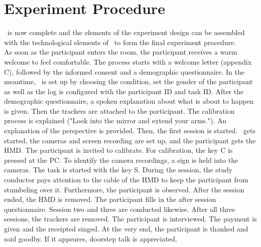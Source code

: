 \section{Experiment Procedure}
\label{sec:procedure}
\exgo\ is now complete and the elements of the experiment design can be assembled with the technological elements of \exgo\ to form the final experiment procedure.\\
As soon as the participant enters the room, the participant receives a warm welcome to feel comfortable. The process starts with a welcome letter (appendix C), followed by the informed consent and a demographic questionnaire. In the meantime, \exgo\ is set up by choosing the condition, set the gender of the participant as well as the log is configured with the participant ID and task ID. After the demographic questionnaire, a spoken explanation about what is about to happen is given. Then the trackers are attached to the participant. The calibration process is explained ("Look into the mirror and extend your arms."). An explanation of the perspective is provided. Then, the first session is started. \exgo\ gets started, the cameras and screen recording are set up, and the participant gets the HMD. The participant is invited to calibrate. For calibration, the key C is pressed at the PC. To identify the camera recordings, a sign is held into the cameras. The task is started with the key S. During the session, the study conductor pays attention to the cable of the HMD to keep the participant from stumbeling over it. Furthermore, the participant is observed. After the session ended, the HMD is removed. The participant fills in the after session questionnaire. Session two and three are conducted likewise. After all three sessions, the trackers are removed. The participant is interviewed. The payment is given and the receipted singed. At the very end, the participant is thanked and said goodby. If it appeares, doorstep talk is appreciated.

